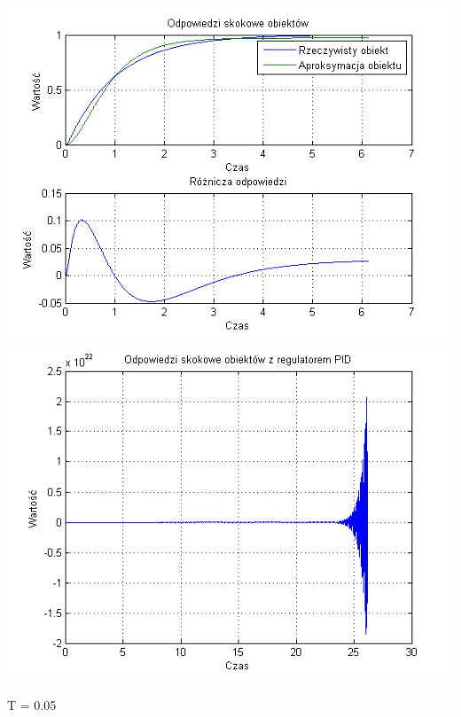 \documentclass[10pt,a4paper]{article}
\begin{document}
\begin{center}
\includegraphics[scale=1]{images/dwa/skrypt_89.png}\\
\includegraphics[scale=1]{images/dwa/skrypt_90.png}\\
\end{center}
\newpage
T = 0.05
\end{document}
